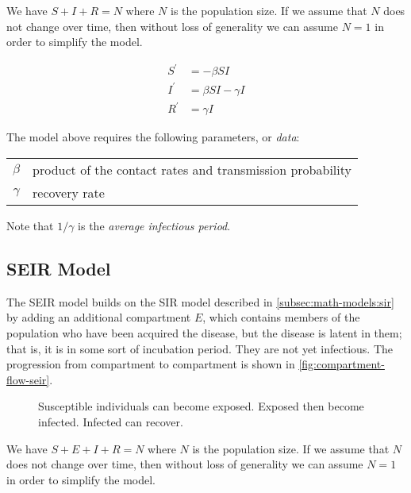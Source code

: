 \documentclass[11pt,a4paper,titlepage]{article}
\newcommand*{\dt}[1]{\ensuremath{#1^{\prime}}}%
\theoremstyle{definition}
\begin{document}
We have $S + I + R = N$ where $N$ is the population size.
If we assume that $N$ does not change over time,
then without loss of generality we can assume $N=1$ in order to simplify the model.

\begin{align}
    \dt{S} & =  - \beta S I \\%
    \dt{I} & = \beta S I - \gamma I \\%
    \dt{R} & = \gamma I%
\end{align}

The model above requires the following parameters,
or \textit{data}:

\begin{tabular}{cl}
    $\beta$ & product of the contact rates and transmission probability\\%
    $\gamma$ & recovery rate
\end{tabular}

Note that $1/\gamma$ is the \textit{average infectious period}.

\subsection{SEIR Model}
\label{subsec:math-models:seir}

The SEIR model builds on the SIR model described in \autoref{subsec:math-models:sir} by adding an additional compartment $E$,
which contains members of the population who have been acquired the disease,
but the disease is latent in them;
that is,
it is in some sort of incubation period.
They are not yet infectious.
The progression from compartment to compartment is shown in \autoref{fig:compartment-flow-seir}.

\begin{figure}
    \caption{
        \label{fig:compartment-flow-seir}
        Susceptible individuals can become exposed.
        Exposed then become infected.
        Infected can recover.
    }
\end{figure}

We have $S + E + I + R = N$ where $N$ is the population size.
If we assume that $N$ does not change over time,
then without loss of generality we can assume $N=1$ in order to simplify the model.
\end{document}
